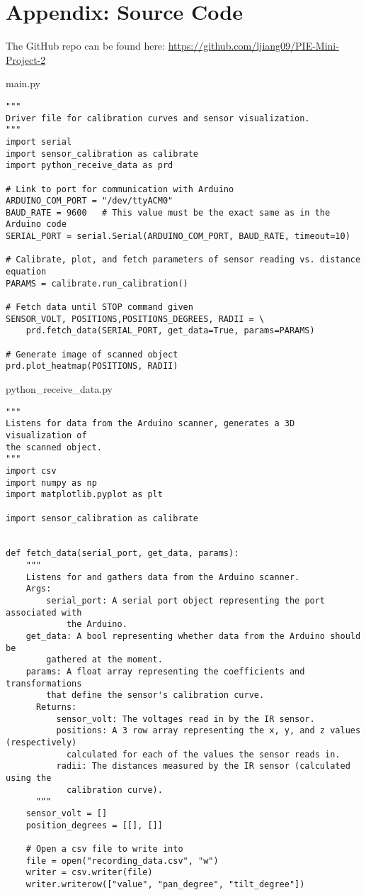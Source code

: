 \documentclass{article}
\begin{document}
\section*{Appendix: Source Code}
The GitHub repo can be found here: \href{https://github.com/ljiang09/PIE-Mini-Project-2}{https://github.com/ljiang09/PIE-Mini-Project-2}
\begin{tcolorbox}
main.py
\begin{verbatim}
"""
Driver file for calibration curves and sensor visualization.
"""
import serial
import sensor_calibration as calibrate
import python_receive_data as prd

# Link to port for communication with Arduino
ARDUINO_COM_PORT = "/dev/ttyACM0"
BAUD_RATE = 9600   # This value must be the exact same as in the Arduino code
SERIAL_PORT = serial.Serial(ARDUINO_COM_PORT, BAUD_RATE, timeout=10)

# Calibrate, plot, and fetch parameters of sensor reading vs. distance equation
PARAMS = calibrate.run_calibration()

# Fetch data until STOP command given
SENSOR_VOLT, POSITIONS,POSITIONS_DEGREES, RADII = \
    prd.fetch_data(SERIAL_PORT, get_data=True, params=PARAMS)

# Generate image of scanned object
prd.plot_heatmap(POSITIONS, RADII)
\end{verbatim}
\end{tcolorbox}



\begin{tcolorbox}
python\_receive\_data.py
\begin{verbatim}
"""
Listens for data from the Arduino scanner, generates a 3D visualization of
the scanned object.
"""
import csv
import numpy as np
import matplotlib.pyplot as plt

import sensor_calibration as calibrate


def fetch_data(serial_port, get_data, params):
    """
    Listens for and gathers data from the Arduino scanner.
    Args:
        serial_port: A serial port object representing the port associated with
            the Arduino.
    get_data: A bool representing whether data from the Arduino should be
        gathered at the moment.
    params: A float array representing the coefficients and transformations
        that define the sensor's calibration curve.
      Returns:
          sensor_volt: The voltages read in by the IR sensor.
          positions: A 3 row array representing the x, y, and z values (respectively)
            calculated for each of the values the sensor reads in.
          radii: The distances measured by the IR sensor (calculated using the
            calibration curve).
      """
    sensor_volt = []
    position_degrees = [[], []]
    
    # Open a csv file to write into
    file = open("recording_data.csv", "w")
    writer = csv.writer(file)
    writer.writerow(["value", "pan_degree", "tilt_degree"])
\end{verbatim}
\end{tcolorbox}
\end{document}

